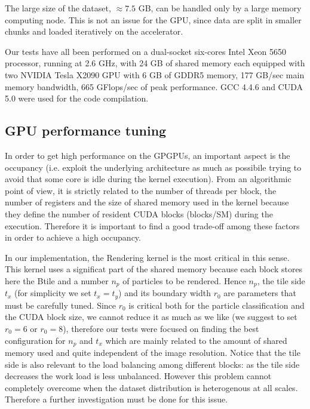 \documentclass[1p]{elsarticle}
\begin{document}
The large size of the dataset, $\approx 7.5$ GB, can be handled only by a large memory computing node. 
This is not an issue for the GPU, since data are split 
in smaller chunks and loaded iteratively on the accelerator. 

Our tests have all been performed on a dual-socket six-cores Intel Xeon 5650 processor,
running at 2.6 GHz, with 24 GB of shared memory 
each equipped with two NVIDIA Tesla X2090 GPU with 6 GB of GDDR5 memory,
177 GB/sec main memory bandwidth, 665 GFlops/sec of peak performance. GCC 4.4.6 and CUDA 5.0 
were used for the code compilation.

\subsection{GPU performance tuning}
\label{sec:gpuperf}
In order to get high performance on the GPGPUs, an important aspect is the occupancy (i.e. exploit the underlying architecture as much as possibile trying to avoid that some core is idle during the kernel execution).
From an algorithmic point of view, it is strictly related to the number of threads per block, the number of registers and the size of shared memory used in the kernel because they define the number of resident CUDA blocks (blocks/SM) during the execution. 
Therefore it is important to find a good trade-off among these factors in order to achieve a high occupancy. 

In our implementation, the Rendering kernel is the most critical in this sense. This kernel uses a significat part of the shared memory because each block stores here the Btile and a number $n_p$ of particles to be rendered. 
Hence $n_p$, the tile side $t_x$ (for simplicity we set $t_x=t_y$) and its boundary width $r_0$ are parameters that must be carefully tuned. 
Since $r_0$ is critical both for the particle classification and the CUDA block size, we cannot reduce it as much as we like (we suggest to set $r_0=6$ or $r_0=8$), therefore our tests were focused on finding the best configuration for $n_p$ and $t_x$ which are mainly related to the amount of shared memory used and quite independent of the image resolution. Notice that the tile side is also relevant to the load balancing among different blocks: as the tile side decreases the work load is less unbalanced. However this problem cannot completely overcome when the dataset distribution is heterogenous at all scales. Therefore a further investigation must be done for this issue.
\end{document}
